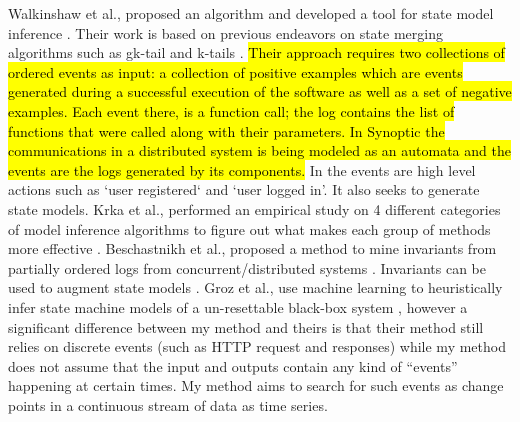 Walkinshaw et al., proposed an algorithm and developed a tool for state model inference \cite{walkinshaw2016inferring}. Their work is based on previous endeavors on state merging algorithms such as gk-tail and k-tails \cite{lorenzoli2008automatic, biermann1972synthesis}. \hl{Their approach requires two collections of ordered events as input: a collection of positive examples which are events generated during a successful execution of the software as well as a set of negative examples. Each event there, is a function call; the log contains the list of functions that were called along with their parameters. 
In Synoptic \cite{schneider2010synoptic} the communications in a distributed system is being modeled as an automata and the events are the logs generated by its components.
}
In \cite{howar2012inferring} the events are high level actions such as `user registered` and `user logged in'. It also seeks to generate state models.
Krka et al., performed an empirical study on 4 different categories of model inference algorithms to figure out what makes each group of methods more effective \cite{krka2014automatic}. Beschastnikh et al., proposed a method to mine invariants from partially ordered logs from concurrent/distributed systems \cite{beschastnikh2011mining}. Invariants can be used to augment state models \cite{beschastnikh2014inferring, beschastnikh2011leveraging}. Groz et al., use machine learning to heuristically infer state machine models of a un-resettable black-box system \cite{groz2018revisiting}, however a significant difference between my method and theirs is that their method still relies on discrete events (such as HTTP request and responses) while my method does not assume that the input and outputs contain any kind of ``events'' happening at certain times. My method aims to search for such events as change points in a continuous stream of data as time series. %



